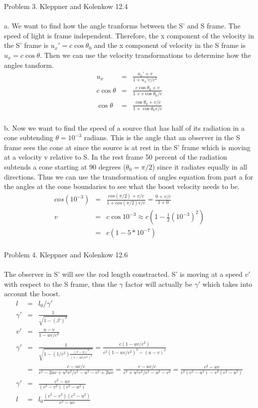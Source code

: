 \documentclass[11pt]{amsart}
\begin{document}
Problem 3. Kleppner and Kolenkow 12.4 \\ \\
a. We want to find how the angle tranforms between the S' and S frame. The speed of light is frame independent. Therefore, the x component of the velocity in the S' frame is $u_{x}'=c\cos{\theta_{0}}$ and the x component of velocity in the S frame is $u_{x}=c\cos{\theta}$. Then we can use the velocity transformations to determine how the angles tansform. \\
\begin{eqnarray*}
u_{x} &=& \frac{u_{x}'+v}{1+u_{x}'v/c^{2}} \\
c\cos{\theta} &=& \frac{c\cos{\theta_{0}}+v}{1+v\cos{\theta_{0}}/c} \\
\cos{\theta} &=& \frac{\cos{\theta_{0}}+v/c}{1+\cos{\theta_{0}}v/c} 
\end{eqnarray*} \\
b. Now we want to find the speed of a source that has half of its radiation in a cone subtending $\theta =10^{-3}$ radians. This is the angle that an observer in the S frame sees the cone at since the source is at rest in the S' frame which is moving at a velocity v relative to S. In the rest frame 50 percent of the radiation subtends a cone starting at 90 degrees ($\theta_{0}=\pi/2$) since it radiates equally in all directions. Thus we can use the transformation of angles equation from part a for the angles at the cone boundaries to see what the boost velocity needs to be. \\
\begin{eqnarray*}
cos(10^{-3}) &=& \frac{cos(\pi/2)+v/c}{1+cos(\pi/2)v/c} = \frac{0+v/c}{1+0} \\
v &=& c\cos{10^{-3}} \approx c(1-\frac{1}{2}(10^{-3})^{2}) \\
&=& c(1-5*10^{-7}) 
\end{eqnarray*} \\

Problem 4. Kleppner and Kolenkow 12.6 \\ \\
The observer in S' will see the rod length constracted. S' is moving at a speed $v'$ with respect to the S frame, thus the $\gamma$ factor will actually be $\gamma'$ which takes into account the boost. \\
\begin{eqnarray*}
l &=& l_{0}/\gamma' \\
\gamma' &=& \frac{1}{\sqrt{1-(\beta')^{2}}} \\
v' &=& \frac{u-v}{1-uv/c^{2}} \\
\gamma' &=& \frac{1}{\sqrt{1-(1/c^{2})\frac{(v-u)^{2}}{(1-uv/c^{2})^{2}}}} = \frac{c(1-uv/c^{2})}{c^{2}(1-uv/c^{2})^{2}-(u-v)^{2}} \\
&=& \frac{c-uv/c}{c^{2}-2uv+u^{2}v^{2}/c^{2}-u^{2}-v^{2}+2uv} = \frac{c-uv/c}{c^{2}+u^{2}v^{2}/c^{2}-u^{2}-v^{2}} = \frac{c^{2}-uv}{c^{2}(c^{2}-u^{2})-v^{2}(c^{2}-u^{2})} \\
\gamma' &=& \frac{c^{2}-uv}{(c^{2}-v^{2})(c^{2}-u^{2})} \\
l &=& l_{0}\frac{(c^{2}-v^{2})(c^{2}-u^{2})}{c^{2}-uv} 
\end{eqnarray*} \\ 
\end{document}
